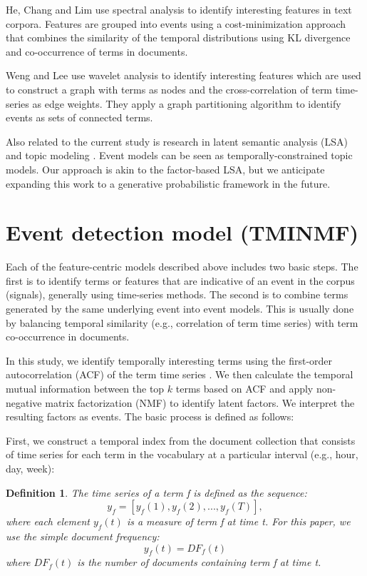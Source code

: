 \documentclass{sig-alternate}
\newtheorem{definition}{Definition}
\begin{document}
He, Chang and Lim \cite{He2007} use spectral analysis to identify interesting features in text corpora. Features are grouped into events using a cost-minimization approach that combines the similarity of the temporal distributions using KL divergence and co-occurrence of terms in documents. 

Weng and Lee \cite{Weng2011} use wavelet analysis to identify interesting features which are used to construct a graph with terms as nodes and the cross-correlation of term time-series as edge weights. They apply a graph partitioning algorithm to identify events as sets of connected terms. 

Also related to the current study is research in latent semantic analysis (LSA) \cite{Deerwester1990, Hofmann1999} and topic modeling \cite{Blei2003}.  Event models can be seen as temporally-constrained topic models. Our approach is akin to the factor-based LSA, but we anticipate expanding this work to a generative probabilistic framework in the future.  




\section{Event detection model (TMINMF)}	

Each of the feature-centric models described above includes two basic steps. The first is to identify terms or features that are indicative of an event in the corpus (signals), generally using time-series methods. The second is to combine terms generated by the same underlying event into event models.  This is usually done by balancing temporal similarity (e.g., correlation of term time series) with term co-occurrence in documents.

In this study, we identify temporally interesting terms using the first-order autocorrelation (ACF) of the term time series \cite{Jones2007}. We then calculate the temporal mutual information between the top $k$ terms based on ACF and apply non-negative matrix factorization (NMF) to identify latent factors. We interpret the resulting factors as events. The basic process is defined as follows:

First, we construct a temporal index from the document collection that consists of time series for each term in the vocabulary at a particular interval (e.g., hour, day, week):
\begin{definition}
 The time series of a term f is defined as the sequence:
\[
y_f = [y_f(1), y_f(2), ..., y_f(T)],
\]
where each element $y_f(t)$ is a measure of term f at time t. For this paper, we use the simple document frequency:
\[
	y_f(t) = DF_f(t)
\]
where $DF_f(t)$ is the number of documents containing term f at time t.
\end{definition}
\end{document}
